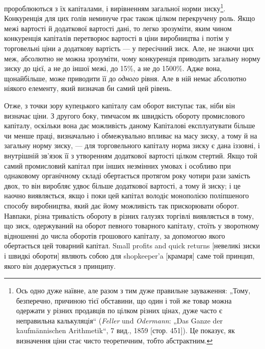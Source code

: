 \parcont{}  %
пророблюються з їх капіталами, і вирівненням загальної норми
зиску\footnote{
Ось одно дуже наївне, але разом з тим дуже правильне зауваження: „Тому,
безперечно, причиною тієї обставини, що один і той же товар можна одержати
у різних продавців по цілком різних цінах, дуже часто є неправильна калькуляція“
(\emph{Feller} und \emph{Odermann}: „Das Ganze der kaufmännischen Arithmetik“, 7 вид.,
1859 [стор. 451]). Це показує, як визначення ціни стає чисто теоретичним,
тобто абстрактним.
}. Конкуренція для цих голів неминуче грає також цілком
перекручену роль. Якщо межі вартості й додаткової вартості
дані, то легко зрозуміти, яким чином конкуренція капіталів перетворює
вартості в ціни виробництва і потім у торговельні ціни
а додаткову вартість — у пересічний зиск. Але, не знаючи цих
меж, абсолютно не можна зрозуміти, чому конкуренція приводить
загальну норму зиску до цієї, а не до іншої межі, до 15\%, а не
до 1500\%. Адже вона, щонайбільше, може приводити її до \emph{одного}
рівня. Але в ній немає абсолютно ніякого елементу, який визначав
би самий цей рівень.

Отже, з точки зору купецького капіталу сам оборот виступає
так, ніби він визначає ціни. З другого боку, тимчасом як швидкість
обороту промислового капіталу, оскільки вона дає можливість
даному Капіталові експлуатувати більше чи менше праці, визначально
і обмежувально впливає на масу зиску, а тому й на
загальну норму зиску, — для торговельного капіталу норма зиску
є дана іззовні, і внутрішній зв’язок її з утворенням додаткової
вартості цілком стертий. Якщо той самий промисловий капітал
при інших незмінних умовах і особливо при однаковому органічному
складі обертається протягом року чотири рази замість
двох, то він виробляє удвоє більше додаткової вартості, а тому
й зиску; і це наочно виявляється, якщо і поки цей капітал володіє
монополією поліпшеного способу виробництва, який дає
йому можливість так прискорювати оборот. Навпаки, різна тривалість
обороту в різних галузях торгівлі виявляється в тому,
що зиск, одержуваний на оборот певного товарного капіталу,
стоїть у зворотному відношенні до числа оборотів грошового
капіталу, за допомогою якого обертається цей товарний капітал.
Small profits and quick returns [невеликі зиски і швидкі обороти]
являють собою для shopkeeper’a [крамаря] саме той принцип,
якого він додержується з принципу.

